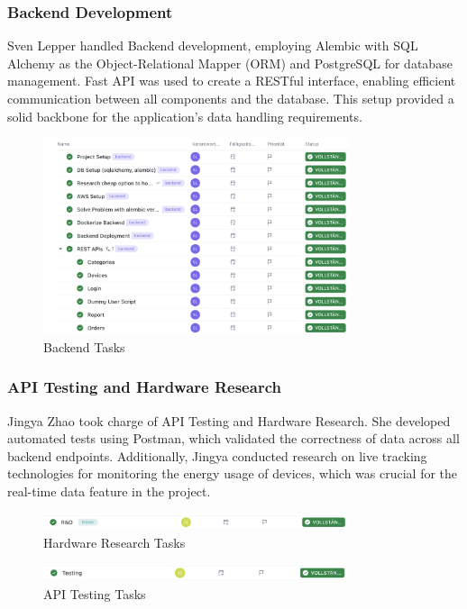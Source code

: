\subsubsection{Backend Development}
Sven Lepper handled Backend development, employing Alembic with SQL Alchemy as the Object-Relational Mapper (ORM) and PostgreSQL for database management. Fast API was used to create a RESTful interface, enabling efficient communication between all components and the database. This setup provided a solid backbone for the application's data handling requirements.

\begin{figure}[h]
    \centering
    \includegraphics[width=0.8\textwidth]{images/backend.png}
    \caption{Backend Tasks}
    \label{fig:myimage}
\end{figure}
\clearpage
\subsubsection{API Testing and Hardware Research}
Jingya Zhao took charge of API Testing and Hardware Research. She developed automated tests using Postman, which validated the correctness of data across all backend endpoints. Additionally, Jingya conducted research on live tracking technologies for monitoring the energy usage of devices, which was crucial for the real-time data feature in the project.

\begin{figure}[h]
    \centering
    \includegraphics[width=0.8\textwidth]{images/R&d.png}
    \caption{Hardware Research Tasks}
    \label{fig:myimage}
\end{figure}
\begin{figure}[h]
    \centering
        \includegraphics[width=0.8\textwidth]{images/testing.png}
    \caption{API Testing Tasks}
    \label{fig:myimage}
\end{figure}

